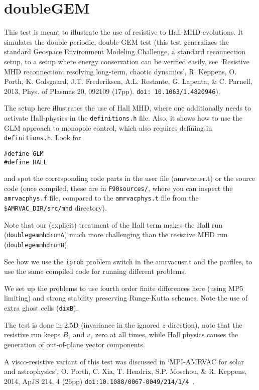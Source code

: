 \documentclass[10pt]{article}
\begin{document}
\section*{doubleGEM}

This test is meant to illustrate the use of resistive to Hall-MHD evolutions. It simulates the double periodic, double GEM test (this test generalizes the standard Geospace Environment Modeling Challenge, a standard reconnection setup, to a setup where energy conservation can be verified easily, see `Resistive MHD reconnection: resolving long-term, chaotic dynamics', R. Keppens, O. Porth, K. Galsgaard, J.T. Frederiksen, A.L. Restante, G. Lapenta, \& C. Parnell, 2013, Phys. of Plasmas 20, 092109 (17pp). {\tt doi: 10.1063/1.4820946}).

The setup here illustrates the use of Hall MHD, where one additionally needs to activate Hall-physics in the {\tt definitions.h} file. Also, it shows how to use the GLM approach to monopole control, which also requires defining in {\tt definitions.h}. Look for

\begin{verbatim}
#define GLM
#define HALL
\end{verbatim}

and spot the corresponding code parts in the user file (amrvacusr.t) or the source code (once compiled, these are in {\tt F90sources/}, where you can inspect the {\tt amrvacphys.f} file, compared to the {\tt amrvacphys.t} file from the {\tt \$AMRVAC\_DIR/src/mhd} directory).


Note that our (explicit) treatment of the Hall term makes the Hall run ({\tt doublegemmhdrunA}) much more challenging than the resistive MHD run ({\tt doublegemmhdrunB}). 

See how we use the {\tt iprob} problem switch in the amrvacusr.t and the parfiles, to use the same compiled code for running different problems.

We set up the problems to use fourth order finite differences here (using MP5 limiting) and strong stability preserving Runge-Kutta schemes. Note the use of extra ghost cells ({\tt dixB}).

The test is done in 2.5D (invariance in the ignored $z$-direction), note that the resistive run keeps $B_z$ and $v_z$ zero at all times, while Hall physics causes the generation of out-of-plane vector components.

A visco-resistive variant of this test was discussed in `MPI-AMRVAC for solar and astrophysics', O. Porth, C. Xia, T. Hendrix, S.P. Moschou, \& R. Keppens, 2014, ApJS 214, 4 (26pp) {\tt doi:10.1088/0067-0049/214/1/4 }.
\end{document}
